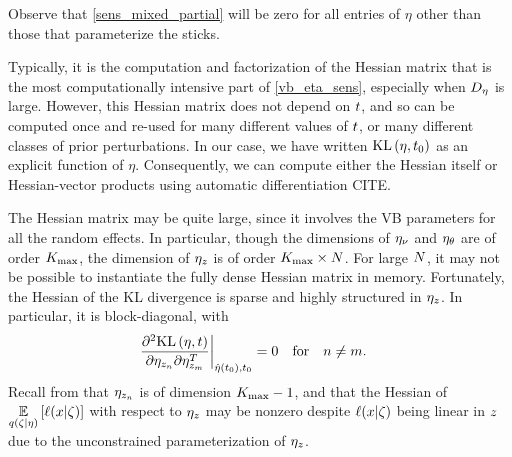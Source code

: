 Observe that \eqref{sens_mixed_partial} will be zero for all entries of
$\eta$ other than those that parameterize the sticks.

Typically, it is the computation and factorization of the Hessian matrix that is
the most computationally intensive part of \eqref{vb_eta_sens}, especially when
${D_{\eta}}$ is large.  However, this Hessian matrix does not depend on $t$, and
so can be computed once and re-used for many different values of $t$, or many
different classes of prior perturbations.  In our case, we have written
$\mathrm{KL}\left(\eta, t_0\right)$ as an explicit function of $\eta$.  Consequently, we can
compute either the Hessian itself or Hessian-vector products using automatic
differentiation CITE.

The Hessian matrix may be quite large, since it involves the VB parameters for
all the random effects.  In particular, though the dimensions of $\eta_{\nu}$ and
$\eta_{\theta}$ are of order ${K_{\mathrm{max}}}$, the dimension of $\eta_{z}$ is of order ${K_{\mathrm{max}}}
\times N$.  For large $N$, it may not be possible to instantiate the fully
dense Hessian matrix in memory.  Fortunately, the Hessian of the KL divergence
is sparse and highly structured in $\eta_{z}$.  In particular, it is
block-diagonal, with
%
\begin{align*}
%
\fracat{\partial^2 \KL{\eta, \t}}
       {\partial \eta_{\z_{n}} \partial \eta_{\z_{m}}^T}
       {\etaopt(\t_0), \t_0} ={}& 0 \mathtxt{for}n\ne m.
%
\end{align*}
%
Recall from  that $\eta_{z_n}$ is of dimension ${K_{\mathrm{max}}} -
1$, and that the Hessian of $\underset{q(\zeta \vert \eta)}{\mathbb{E}}\left[\ell(x \vert
\zeta)\right]$ with respect to $\eta_{z}$ may be nonzero despite $\ell(x \vert \zeta)$
being linear in $z$ due to the unconstrained parameterization of $\eta_{z}$.

